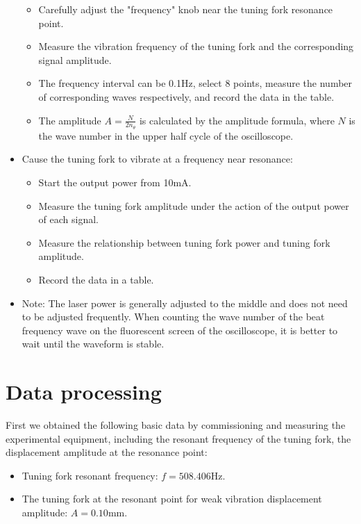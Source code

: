 \documentclass[UTF8]{article}
\begin{document}
\begin{itemize}
\begin{itemize}
	\item Carefully adjust the "frequency" knob near the tuning fork resonance point.
	\item Measure the vibration frequency of the tuning fork and the corresponding signal amplitude.
	\item The frequency interval can be 0.1Hz, select 8 points, measure the number of corresponding waves respectively, and record the data in the table.
	\item The amplitude $A = \frac{N}{2n_\theta}$ is calculated by the amplitude formula, where $N$ is the wave number in the upper half cycle of the oscilloscope.
	\end{itemize}
	\item Cause the tuning fork to vibrate at a frequency near resonance:
	\begin{itemize}
	\item Start the output power from 10mA.
	\item Measure the tuning fork amplitude under the action of the output power of each signal.
	\item Measure the relationship between tuning fork power and tuning fork amplitude.
	\item Record the data in a table.
	\end{itemize}
	\item Note: The laser power is generally adjusted to the middle and does not need to be adjusted frequently. When counting the wave number of the beat frequency wave on the fluorescent screen of the oscilloscope, it is better to wait until the waveform is stable.
	\end{itemize}
    
	
	\section{Data processing}
    First we obtained the following basic data by commissioning and measuring the experimental equipment, including the resonant frequency of the tuning fork, the displacement amplitude at the resonance point:
    \begin{itemize}
    \item Tuning fork resonant frequency: $f = 508.406  \text{Hz}$.
    \item The tuning fork at the resonant point for weak vibration displacement amplitude: $A = 0.10  \text{mm}$.
    \end{itemize}
    
\end{document}
